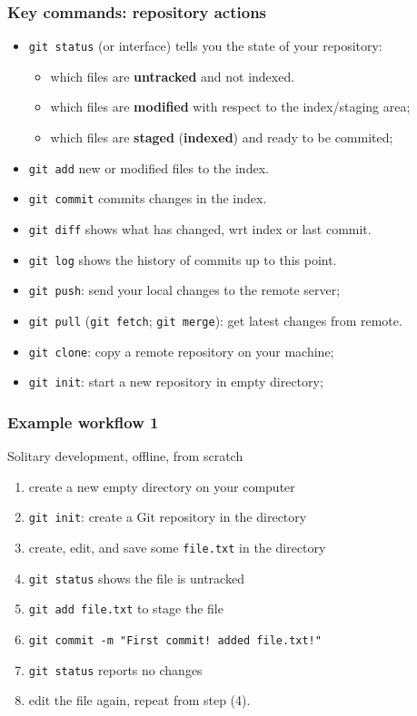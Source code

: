 \documentclass[10pt,svgnames,handout]{beamer}
\begin{document}
\begin{frame}
\frametitle{Key commands: repository actions}

\begin{itemize}[<+->]
\item \lstinline{git status} (or interface) tells you the state of your repository:
\begin{itemize}
  \item which files are \textbf{untracked} and not indexed.
  \item which files are \textbf{modified} with respect to the index/staging area;
  \item which files are \textbf{staged} (\textbf{indexed}) and ready to be commited;
\end{itemize}
\item \lstinline|git add| new or modified files to the index.
\item \lstinline|git commit| commits changes in the index.
\bigskip
\item \lstinline{git diff} shows what has changed, wrt index or last commit.
\item \lstinline{git log} shows the history of commits up to this point.
\bigskip
\item \lstinline|git push|: send your local changes to the remote server;
\item \lstinline|git pull| (\lstinline{git fetch}; \lstinline{git merge}): get latest changes from remote.
\bigskip
\item \lstinline|git clone|: copy a remote repository on your machine;
\item \lstinline|git init|: start a new repository in empty directory;
\end{itemize}
\end{frame}


\begin{frame}
\frametitle{Example workflow 1}

\begin{block}{Solitary development, offline, from scratch}
    
\begin{enumerate}
  \item create a new empty directory on your computer
  \item \lstinline|git init|: create a Git repository in the directory
  \item create, edit, and save some \texttt{file.txt} in the directory
  \item \lstinline|git status| shows the file is untracked
  \item \lstinline|git add file.txt| to stage the file
  \item \lstinline|git commit -m "First commit! added file.txt!"|
  \item \lstinline|git status| reports no changes
  \item edit the file again, repeat from step (4).
\end{enumerate}
\end{block}
\end{frame}
\end{document}
